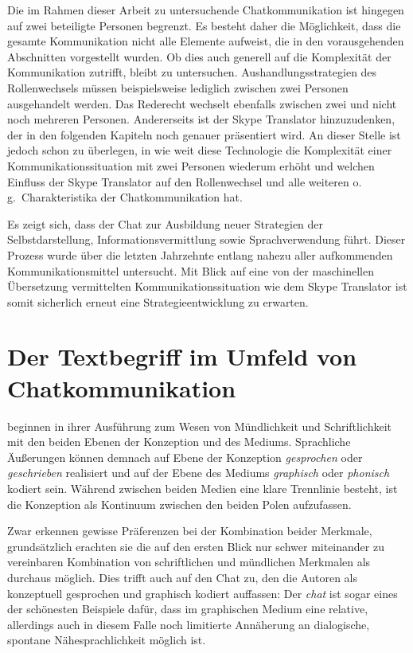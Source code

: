 Die im Rahmen dieser Arbeit zu untersuchende Chatkommunikation ist hingegen auf zwei beteiligte Personen begrenzt. Es besteht daher die Möglichkeit, dass die gesamte Kommunikation nicht alle Elemente aufweist, die in den vorausgehenden Abschnitten vorgestellt wurden. Ob dies auch generell auf die Komplexität der Kommunikation zutrifft, bleibt zu untersuchen. Aushandlungsstrategien des Rollenwechsels müssen beispielsweise lediglich zwischen zwei Personen ausgehandelt werden. Das Rederecht wechselt ebenfalls zwischen zwei und nicht noch mehreren Personen. Andererseits ist der Skype Translator hinzuzudenken, der in den folgenden Kapiteln noch genauer präsentiert wird. An dieser Stelle ist jedoch schon zu überlegen, in wie weit diese Technologie die Komplexität einer Kommunikationssituation mit zwei Personen wiederum erhöht und welchen Einfluss der Skype Translator auf den Rollenwechsel und alle weiteren o.\,g.\ Charakteristika der Chatkommunikation hat. 

Es zeigt sich, dass der Chat zur Ausbildung neuer Strategien der Selbstdarstellung, Informationsvermittlung sowie Sprachverwendung führt. Dieser Prozess wurde über die letzten Jahrzehnte entlang nahezu aller aufkommenden Kommunikationsmittel untersucht. Mit Blick auf eine von der maschinellen Übersetzung vermittelten Kommunikationssituation wie dem Skype Translator ist somit sicherlich erneut eine Strategieentwicklung zu erwarten. 



\section{Der Textbegriff im Umfeld von Chatkommunikation}
\label{K2:sec:Textbegriff}


\citet[3]{koch_gesprochene_2011} beginnen in ihrer Ausführung zum Wesen von Mündlichkeit und Schriftlichkeit mit den beiden Ebenen der Konzeption und des Mediums. Sprachliche Äußerungen können demnach auf Ebene der Konzeption \emph{gesprochen} oder \emph{geschrieben} realisiert und auf der Ebene des Mediums \emph{graphisch} oder \emph{phonisch} kodiert sein. Während zwischen beiden Medien eine klare Trennlinie besteht, ist die Konzeption als Kontinuum zwischen den beiden Polen aufzufassen.

Zwar erkennen \citet[4]{koch_gesprochene_2011} gewisse Präferenzen bei der Kombination beider Merkmale, grundsätzlich erachten sie die auf den ersten Blick nur schwer miteinander zu vereinbaren Kombination von schriftlichen und mündlichen Merkmalen als durchaus möglich. Dies trifft auch auf den Chat zu, den die Autoren als konzeptuell gesprochen und graphisch kodiert auffassen: \glqq Der \emph{chat} ist sogar eines der schönesten Beispiele dafür, dass im graphischen Medium eine relative, allerdings auch in diesem Falle noch limitierte Annäherung an dialogische, spontane Nähesprachlichkeit möglich ist.\grqq{} \citep[][14, Kursivierung im Original]{koch_gesprochene_2011}

